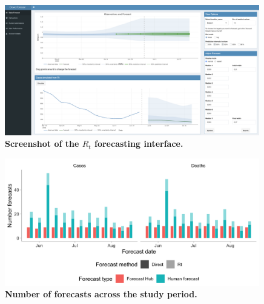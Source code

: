 \documentclass[10pt,a4paper,twocolumn]{article}
\begin{document}
\begin{figure}
\centering
\includegraphics[width=0.99\textwidth]{../output/figures/screenshot-crowd-rt-app.png}
\caption{\bf{Screenshot of the $R_t$ forecasting interface.}}
\label{fig:screenshot-rt}
\end{figure}

\begin{figure}
\centering
\includegraphics[width=0.99\textwidth]{../output/figures/num-forecasters.png}
\caption{\bf{Number of forecasts across the study period.}}
\label{fig:num-forecasters}
\end{figure}
\end{document}

